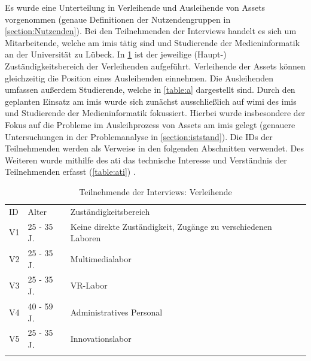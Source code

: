 Es wurde eine Unterteilung in Verleihende und Ausleihende von Assets vorgenommen (genaue
Definitionen der Nutzendengruppen in \ref{section:Nutzenden}). Bei den Teilnehmenden der Interviews
handelt es sich um Mitarbeitende, welche am \ac{imis} tätig sind und Studierende der
Medieninformatik an der Universität zu Lübeck. In \ref{table:v} ist der jeweilige (Haupt-)
Zuständigkeitsbereich der Verleihenden aufgeführt. Verleihende der Assets können gleichzeitig die
Position eines Ausleihenden einnehmen. Die Ausleihenden umfassen außerdem Studierende, welche in
\ref{table:a} dargestellt sind. Durch den geplanten Einsatz am \ac{imis} wurde sich zunächst
ausschließlich auf \ac{wimi} des \ac{imis} und Studierende der Medieninformatik fokussiert. Hierbei
wurde insbesondere der Fokus auf die Probleme im Ausleihprozess von Assets am \ac{imis} gelegt
(genauere Untersuchungen in der Problemanalyse in \ref{section:iststand}). Die IDs der Teilnehmenden
werden als Verweise in den folgenden Abschnitten verwendet. Des Weiteren wurde mithilfe des \ac{ati}
das technische Interesse und Verständnis der Teilnehmenden erfasst (\ref{table:ati})
\cite{attig_assessing_2017}.


\begin{table}[h]
        \centering
        \caption{Teilnehmende der Interviews: Verleihende}
        \begin{tabular}{lll}
                \arrayrulecolor{maincolor}\hline
                \sffamily\color{maincolor}ID & \sffamily\color{maincolor}Alter &
                \sffamily\color{maincolor}Zuständigkeitsbereich
                \\
                \arrayrulecolor{maincolor}\hline
                V1                           & 25 - 35 J.                      &
                Keine direkte Zuständigkeit, Zugänge zu verschiedenen Laboren
                \\
                V2                           & 25 - 35 J.                      &
                Multimedialabor                                                  \\
                V3                           & 25 - 35 J.                      &
                VR-Labor                                                         \\
                V4                           & 40 - 59 J.                      &
                Administratives Personal
                \\
                V5                           & 25 - 35 J.                      &
                Innovationslabor                                                 \\
                \arrayrulecolor{maincolor}\hline
        \end{tabular}
        \label{table:v}
\end{table}

